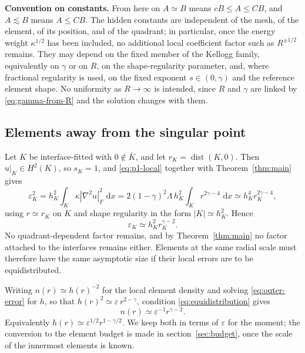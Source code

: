 \documentclass[10pt,pdftex]{amsart}%
\numberwithin{equation}{section}
\newcommand{\dd}{\,\mathrm{d}}
\begin{document}
\medskip \noindent\textbf{Convention on constants.} From here on $A\simeq B$ means $cB\le A\le CB$, and $A\lesssim B$ means $A\le CB$.  The hidden constants are independent of the mesh, of the element, of its position, and of the quadrant; in particular, once the energy weight $\kappa^{1/2}$ has been included, no additional local coefficient factor such as $R^{\pm1/2}$ remains.  They may depend on the fixed member of the Kellogg family, equivalently on $\gamma$ or on $R$, on the shape-regularity parameter, and, where fractional regularity is used, on the fixed exponent $s\in(0,\gamma)$ and the reference element shape.  No uniformity as $R\to\infty$ is intended, since $R$ and $\gamma$ are linked by \eqref{eq:gamma-from-R} and the solution changes with them.

\subsection{Elements away from the singular point}

Let $K$ be interface-fitted with $0\notin\overline K$, and let $r_K=\operatorname{dist}(K,0)$.  Then $u|_K\in H^2(K)$, so $s_K=1$, and \eqref{eq:p1-local} together with Theorem~\ref{thm:main} gives
\begin{equation}\label{eq:outer-contribution}
 \varepsilon_K^2
 =h_K^2\int_K\kappa|\nabla^2u|_F^2\,\dd x
 =2(1-\gamma)^2\Lambda\,h_K^2\int_K r^{2\gamma-4}\,\dd x
 \simeq h_K^4r_K^{2\gamma-4},
\end{equation}
using $r\simeq r_K$ on $K$ and shape regularity in the form $|K|\simeq h_K^2$.  Hence
\begin{equation}\label{eq:outer-error}
 \boxed{\varepsilon_K\simeq h_K^2r_K^{\gamma-2}.}
\end{equation}
No quadrant-dependent factor remains, and by Theorem~\ref{thm:main} no factor attached to the interfaces remains either.  Elements at the same radial scale must therefore have the same asymptotic size if their local errors are to be equidistributed.

Writing $n(r)\simeq h(r)^{-2}$ for the local element density and solving \eqref{eq:outer-error} for $h$, so that $h(r)^2\simeq\varepsilon\,r^{2-\gamma}$, condition \eqref{eq:equidistribution} gives
\begin{equation}\label{eq:density-from-equi}
  n(r)\simeq\varepsilon^{-1}r^{\gamma-2}.
\end{equation}
Equivalently $h(r)\simeq\varepsilon^{1/2}r^{1-\gamma/2}$.  We keep both in terms of $\varepsilon$ for the moment; the conversion to the element budget is made in section~\ref{sec:budget}, once the scale of the innermost elements is known.
\end{document}
